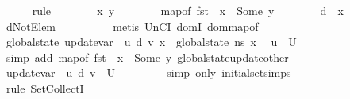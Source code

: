\begin{isabellebody}
\ \ \ \ \isamarkupfalse%
\ {\isacharparenleft}{\kern0pt}rule{\isacharplus}{\kern0pt}{\isacharparenright}{\kern0pt}\isanewline
\ \ \ \ \ \ \isamarkupfalse%
\ x\ y\isanewline
\ \ \ \ \ \ \isamarkupfalse%
\ {\isachardoublequoteopen}map{\isacharunderscore}{\kern0pt}of\ {\isacharparenleft}{\kern0pt}fst\ {\isasymLambda}{\isacharparenright}{\kern0pt}\ x\ {\isacharequal}{\kern0pt}\ Some\ y{\isachardoublequoteclose}\isanewline
\ \ \ \ \ \ \isamarkupfalse%
\ {\isachardoublequoteopen}d\ {\isasymnoteq}\ x{\isachardoublequoteclose}\ \isamarkupfalse%
\ dNotElem\isanewline
\ \ \ \ \ \ \ \ \isamarkupfalse%
\ {\isacharparenleft}{\kern0pt}metis\ UnCI\ domI\ dom{\isacharunderscore}{\kern0pt}map{\isacharunderscore}{\kern0pt}of{\isacharunderscore}{\kern0pt}{}{\isacharparenright}{\kern0pt}\isanewline
\ \ \ \ \ \ \isamarkupfalse%
\ {\isachardoublequoteopen}global{\isacharunderscore}{\kern0pt}state\ {\isacharparenleft}{\kern0pt}update{\isacharunderscore}{\kern0pt}var\ {\isasymLambda}{\isacharprime}{\kern0pt}\ u\ d\ v{\isacharparenright}{\kern0pt}\ x\ {\isacharequal}{\kern0pt}\ global{\isacharunderscore}{\kern0pt}state\ ns\ x{\isachardoublequoteclose}\ \isamarkupfalse%
\ {\isacartoucheopen}u\ {\isasymin}\ {\isacharquery}{\kern0pt}U{\isacartoucheclose}\isanewline
\ \ \ \ \ \ \ \ \isamarkupfalse%
\ {\isacharparenleft}{\kern0pt}simp\ add{\isacharcolon}{\kern0pt}\ {\isacartoucheopen}map{\isacharunderscore}{\kern0pt}of\ {\isacharparenleft}{\kern0pt}fst\ {\isasymLambda}{\isacharparenright}{\kern0pt}\ x\ {\isacharequal}{\kern0pt}\ Some\ y{\isacartoucheclose}\ global{\isacharunderscore}{\kern0pt}state{\isacharunderscore}{\kern0pt}update{\isacharunderscore}{\kern0pt}other{\isacharparenright}{\kern0pt}\isanewline
\ \ \ \ \isamarkupfalse%
\isanewline
\ \ \ \ \isamarkupfalse%
\ {\isachardoublequoteopen}update{\isacharunderscore}{\kern0pt}var\ {\isasymLambda}{\isacharprime}{\kern0pt}\ u\ d\ v\ {\isasymin}\ {\isacharquery}{\kern0pt}U{\isachardoublequoteclose}\ \isanewline
\ \ \ \ \ \ \isamarkupfalse%
\ {\isacharparenleft}{\kern0pt}simp\ only{\isacharcolon}{\kern0pt}\ initial{\isacharunderscore}{\kern0pt}set{\isachardot}{\kern0pt}simps{\isacharparenright}{\kern0pt}\isanewline
\ \ \ \ \ \ \isamarkupfalse%
\ {\isacharparenleft}{\kern0pt}rule\ Set{\isachardot}{\kern0pt}CollectI{\isacharparenright}{\kern0pt}\isanewline
\ \ \ \ \ \ \isamarkupfalse%

\end{isabellebody}
